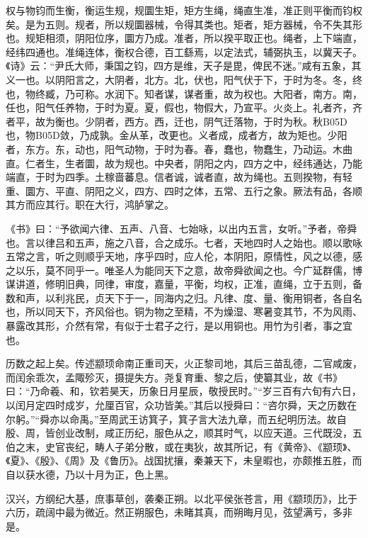 \documentclass[]{article}
\begin{document}
权与物钧而生衡，衡运生规，规圜生矩，矩方生绳，绳直生准，准正则平衡而钧权矣。是为五则。规者，所以规圜器械，令得其类也。矩者，矩方器械，令不失其形也。规矩相须，阴阳位序，圜方乃成。准者，所以揆平取正也。绳者，上下端直，经纬四通也。准绳连体，衡权合德，百工繇焉，以定法式，辅弼执玉，以冀天子。《诗》云：``尹氏大师，秉国之钧，四方是维，天子是毘，俾民不迷。''咸有五象，其义一也。以阴阳言之，大阴者，北方。北，伏也，阳气伏于下，于时为冬。冬，终也，物终臧，乃可称。水润下。知者谋，谋者重，故为权也。大阳者，南方。南，任也，阳气任养物，于时为夏。夏，假也，物假大，乃宣平。火炎上。礼者齐，齐者平，故为衡也。少阴者，西方。西，迁也，阴气迁落物，于时为秋。秋B05D也，物B05D敛，乃成孰。金从革，改更也。义者成，成者方，故为矩也。少阳者，东方。东，动也，阳气动物，于时为春。春，蠢也，物蠢生，乃动运。木曲直。仁者生，生者圜，故为规也。中央者，阴阳之内，四方之中，经纬通达，乃能端直，于时为四季。土稼啬蕃息。信者诚，诚者直，故为绳也。五则揆物，有轻重、圜方、平直、阴阳之义，四方、四时之体，五常、五行之象。厥法有品，各顺其方而应其行。职在大行，鸿胪掌之。

《书》曰：``予欲闻六律、五声、八音、七始咏，以出内五言，女听。''予者，帝舜也。言以律吕和五声，施之八音，合之成乐。七者，天地四时人之始也。顺以歌咏五常之言，听之则顺乎天地，序乎四时，应人伦，本阴阳，原情性，风之以德，感之以乐，莫不同乎一。唯圣人为能同天下之意，故帝舜欲闻之也。今广延群儒，博谋讲道，修明旧典，同律，审度，嘉量，平衡，均权，正准，直绳，立于五则，备数和声，以利兆民，贞天下于一，同海内之归。凡律、度、量、衡用铜者，各自名也，所以同天下，齐风俗也。铜为物之至精，不为燥湿、寒暑变其节，不为风雨、暴露改其形，介然有常，有似于士君子之行，是以用铜也。用竹为引者，事之宜也。

历数之起上矣。传述颛顼命南正重司天，火正黎司地，其后三苗乱德，二官咸废，而闰余乖次，孟陬殄灭，摄提失方。尧复育重、黎之后，使纂其业，故《书》曰：``乃命羲、和，钦若昊天，历象日月星辰，敬授民时。''``岁三百有六旬有六日，以闰月定四时成岁，允厘百官，众功皆美。''其后以授舜曰：``咨尔舜，天之历数在尔躬。''``舜亦以命禹。''至周武王访箕子，箕子言大法九章，而五纪明历法。故自殷、周，皆创业改制，咸正历纪，服色从之，顺其时气，以应天道。三代既没，五伯之末，史官丧纪，畴人子弟分散，或在夷狄，故其所记，有《黄帝》、《颛顼》、《夏》、《殷》、《周》及《鲁历》。战国扰攘，秦兼天下，未皇暇也，亦颇推五胜，而自以获水德，乃以十月为正，色上黑。

汉兴，方纲纪大基，庶事草创，袭秦正朔。以北平侯张苍言，用《颛顼历》，比于六历，疏阔中最为微近。然正朔服色，未睹其真，而朔晦月见，弦望满亏，多非是。
\end{document}
